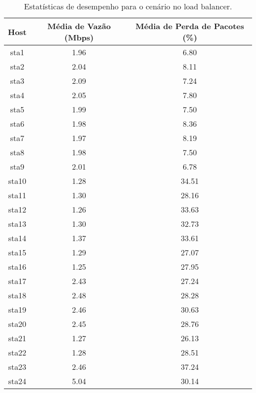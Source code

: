 \begin{table}[htbp]
    \centering
    \label{tab:no_load_balancer_stats}
    \begin{tabular}{|c|c|c|}
        \hline
        \textbf{Host} & \textbf{Média de Vazão (Mbps)} & \textbf{Média de Perda de Pacotes (\%)} \\ \hline
        sta1 & 1.96 & 6.80 \\ \hline
        sta2 & 2.04 & 8.11 \\ \hline
        sta3 & 2.09 & 7.24 \\ \hline
        sta4 & 2.05 & 7.80 \\ \hline
        sta5 & 1.99 & 7.50 \\ \hline
        sta6 & 1.98 & 8.36 \\ \hline
        sta7 & 1.97 & 8.19 \\ \hline
        sta8 & 1.98 & 7.50 \\ \hline
        sta9 & 2.01 & 6.78 \\ \hline
        sta10 & 1.28 & 34.51 \\ \hline
        sta11 & 1.30 & 28.16 \\ \hline
        sta12 & 1.26 & 33.63 \\ \hline
        sta13 & 1.30 & 32.73 \\ \hline
        sta14 & 1.37 & 33.61 \\ \hline
        sta15 & 1.29 & 27.07 \\ \hline
        sta16 & 1.25 & 27.95 \\ \hline
        sta17 & 2.43 & 27.24 \\ \hline
        sta18 & 2.48 & 28.28 \\ \hline
        sta19 & 2.46 & 30.63 \\ \hline
        sta20 & 2.45 & 28.76 \\ \hline
        sta21 & 1.27 & 26.13 \\ \hline
        sta22 & 1.28 & 28.51 \\ \hline
        sta23 & 2.46 & 37.24 \\ \hline
        sta24 & 5.04 & 30.14 \\ \hline
    \end{tabular}
    \caption{Estatísticas de desempenho para o cenário no load balancer.}
\end{table}

